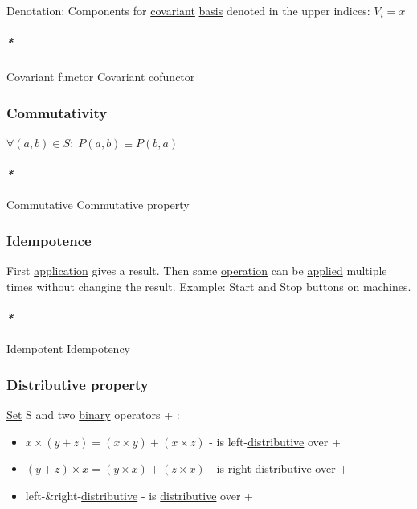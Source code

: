 \documentclass[a4paper,14pt,oneside]{book}
\begin{document}
Denotation:
Components for \hyperref[org97bbf82]{covariant} \hyperref[org93d27e4]{basis} denoted in the upper indices:
\(V_{i} = x\)

\subparagraph{\emph{*}}
\label{sec:orgc8fdf49}

\label{org98077b2}Covariant functor
\label{org5168f1d}Covariant cofunctor

\subsubsection{\label{org94e9139}Commutativity}
\label{sec:orgc3c2085}
\(\forall (a,b) \in S : \; P(a,b) \equiv P(b,a)\)

\paragraph{\emph{*}}
\label{sec:org803716f}

\label{org0887c8f}Commutative
\label{orgc8fc58f}Commutative property

\subsubsection{\label{org5ad812e}Idempotence}
\label{sec:orga3099f9}
First \hyperref[org840185e]{application} gives a result. Then same \hyperref[org706e3b6]{operation} can be \hyperref[org4514181]{applied} multiple times without changing the result.
Example: Start and Stop buttons on machines.

\paragraph{\emph{*}}
\label{sec:orge3f6e66}

\label{orgab55c75}Idempotent
\label{org35e8652}Idempotency

\subsubsection{\label{orgfd53d8d}Distributive property}
\label{sec:orgcc8a63f}
\hyperref[org0d04814]{Set} S and two \hyperref[org238f496]{binary} operators + \texttimes{}:

\begin{itemize}
\item \(x \times (y + z) = (x \times y) + (x \times z)\) - \texttimes{} is left-\hyperref[orga95862a]{distributive} over +
\item \((y + z) \times x = (y \times x) + (z \times x)\) - \texttimes{} is right-\hyperref[orga95862a]{distributive} over +
\item left-\&right-\hyperref[orga95862a]{distributive} - \texttimes{} is \hyperref[orga95862a]{distributive} over +
\end{itemize}
\end{document}
